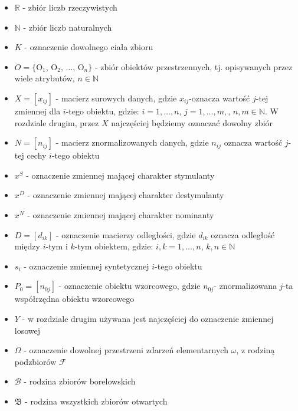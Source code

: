 \documentclass[12pt,a4paper]{report}
\newcommand{\mediana}{\operatorname{med}}
\newcommand{\licznosc}[1]{\overline{\overline{#1}}}
\begin{document}
\begin{itemize}
\item $\mathbb{R}$ - zbiór liczb rzeczywistych
\item $\mathbb{N}$ - zbiór liczb naturalnych
\item $K$ - oznaczenie dowolnego ciała zbioru
\item $O = \{$O$_{1}$, O$_{2}$, $\dots$, O$_{n}\}$ - zbiór obiektów przestrzennych, tj. opisywanych przez wiele atrybutów, $n \in \mathbb{N}$
\item $X=[x_{ij}]$ - macierz surowych danych, gdzie $x_{ij}$-oznacza wartość $j$-tej zmiennej dla $i$-tego obiektu, gdzie: $i=1,\ldots,n$, $j=1,\ldots, m,$, $n,m \in \mathbb{N}$. W rozdziale drugim, przez $X$ najczęściej będziemy oznaczać dowolny zbiór
\item $N=[n_{ij}]$ - macierz znormalizowanych danych, gdzie $n_{ij}$ oznacza wartość $j$-tej cechy $i$-tego obiektu
\item $x^{S}$ - oznaczenie zmiennej mającej charakter stymulanty
\item $x^{D}$ - oznaczenie zmiennej mającej charakter destymulanty
\item $x^{N}$ - oznaczenie zmiennej mającej charakter nominanty
\item $D=[d_{ik}]$ - oznaczenie macierzy odległości, gdzie $d_{ik}$ oznacza odległość między $i$-tym i $k$-tym obiektem, gdzie: $i, k=1,\ldots,n$, $k,n \in \mathbb{N}$
\item $s_{i}$ - oznaczenie zmiennej syntetycznej $i$-tego obiektu
\item $P_{0}=[n_{0j}]$ - oznaczenie obiektu wzorcowego, gdzie $n_{0j}$- znormalizowana $j$-ta współrzędna obiektu wzorcowego
\item $Y$ - w rozdziale drugim używana jest najczęściej do oznaczenie zmiennej losowej
\item $\Omega$ - oznaczenie dowolnej przestrzeni zdarzeń elementarnych $\omega$, z rodziną podzbiorów $\mathcal{F}$
\item $\mathcal{B}$ - rodzina zbiorów borelowskich
\item $\mathfrak{B}$ - rodzina wszystkich zbiorów otwartych %

\end{itemize}
\end{document}
